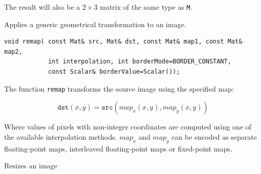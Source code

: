 The result will also be a $2 \times 3$ matrix of the same type as \texttt{M}.

\label{remap}
Applies a generic geometrical transformation to an image.

\begin{lstlisting}
void remap( const Mat& src, Mat& dst, const Mat& map1, const Mat& map2,
            int interpolation, int borderMode=BORDER_CONSTANT,
            const Scalar& borderValue=Scalar());
\end{lstlisting}
\begin{description}
\end{description}

The function \texttt{remap} transforms the source image using the specified map:

\[
\texttt{dst}(x,y) = \texttt{src}(map_x(x,y),map_y(x,y))
\]

Where values of pixels with non-integer coordinates are computed using one of the available interpolation methods. $map_x$ and $map_y$ can be encoded as separate floating-point maps, interleaved floating-point maps or fixed-point maps.

\label{resize}
Resizes an image

